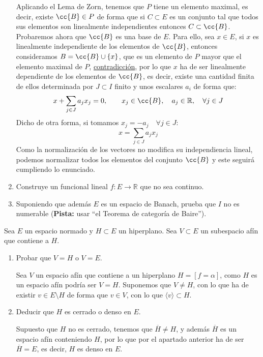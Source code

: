 \begin{ejercicio}
\begin{enumerate}[label=\alph*)]
            Aplicando el Lema de Zorn, tenemos que $P$ tiene un elemento maximal, es decir, existe $\cc{B}\in P$ de forma que si $C\subset E$ es un conjunto tal que todos sus elementos son linealmente independientes entonces $C\subset \cc{B}$. Probaremos ahora que $\cc{B}$ es una base de $E$. Para ello, sea $x\in E$, si $x$ es linealmente independiente de los elementos de $\cc{B}$, entonces consideramos $B = \cc{B}\cup \{x\}$, que es un elemento de $P$ mayor que el elemento maximal de $P$, \underline{contradicción}, por lo que $x$ ha de ser linealmente dependiente de los elementos de $\cc{B}$, es decir, existe una cantidad finita de ellos determinada por $J\subset I$ finito y unos escalares $a_i$ de forma que:
            \begin{equation*}
                x + \sum_{j\in J}a_j x_j = 0, \qquad x_j \in \cc{B}, \quad a_j\in \mathbb{R}, \quad \forall j\in J
            \end{equation*}
            Dicho de otra forma, si tomamos $x_j = -a_j \quad \forall j\in J$:
            \begin{equation*}
                x = \sum_{j\in J} a_jx_j
            \end{equation*}
            Como la normalización de los vectores no modifica su independiencia lineal, podemos normalizar todos los elementos del conjunto $\cc{B}$ y este seguirá cumpliendo lo enunciado.

        \item Construye un funcional lineal $f:E\to \mathbb{R}$ que no sea continuo. %
        \item Suponiendo que además $E$ es un espacio de Banach, prueba que $I$ no es numerable (\textbf{Pista:} usar ``el Teorema de categoría de Baire'').
    \end{enumerate}
\end{ejercicio}

\begin{ejercicio} %
    Sea $E$ un espacio normado y $H\subset E$ un hiperplano. Sea $V\subset E$ un subespacio afín que contiene a $H$.
    \begin{enumerate}[label=\alph*)]
        \item Probar que $V=H$ o $V=E$.

            Sea $V$ un espacio afín que contiene a un hiperplano $H =[f=\alpha]$, como $H$ es un espacio afín podría ser $V=H$. Suponemos que $V\neq H$, con lo que ha de existir $v\in E\setminus H$ de forma que $v\in V$, con lo que $\langle v \rangle \subset H$. %
        \item Deducir que $H$ es cerrado o denso en $E$.

            Supuesto que $H$ no es cerrado, tenemos que $\overline{H}\neq H$, y además $\overline{H}$ es un espacio afín conteniendo $H$, por lo que por el apartado anterior ha de ser $\overline{H}=E$, es decir, $H$ es denso en $E$.
    \end{enumerate}
\end{ejercicio}

